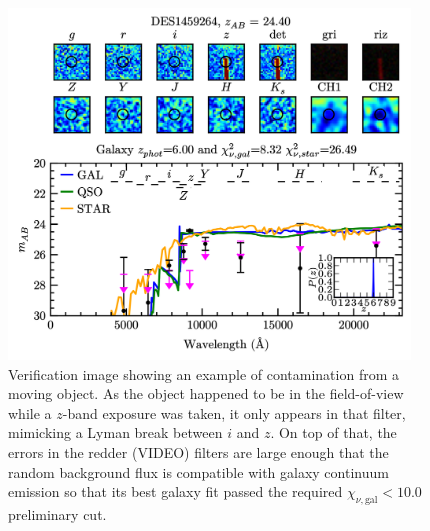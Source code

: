 \begin{figure}[tb]
\centering
\includegraphics[width=0.95\textwidth]{Chapter4/Figs/DES1459264_thesis.png}
\caption[Example of contamination from a transient]{Verification image showing an example of contamination from a moving object. As the object happened to be in the field-of-view while a $z$-band exposure was taken, it only appears in that filter, mimicking a Lyman break between $i$ and $z$. On top of that, the errors in the redder (VIDEO) filters are large enough that the random background flux is compatible with galaxy continuum emission so that its best galaxy fit passed the required $\chi_{\nu,\mathrm{gal}}<10.0$ preliminary cut.}
\label{fig:example_transient}
\end{figure}

